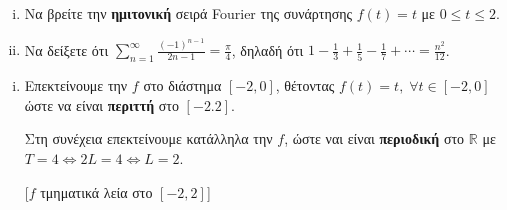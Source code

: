 \begin{mybox3}
  \begin{example}
  \item{}
  \item{}
    \begin{enumerate}[i)]
      \item Να βρείτε την \textbf{ημιτονική} σειρά Fourier της συνάρτησης 
        $ f(t)=t $ με $ 0 \leq t \leq 2 $.
      \item Να δείξετε ότι $ \sum_{n=1}^{\infty} \frac{(-1)^{n-1}}{2n-1} = 
        \frac{\pi}{4} $, δηλαδή ότι $ 1 - \frac{1}{3} + \frac{1}{5} - \frac{1}{7}
        + \cdots = \frac{n^{2}}{12} $.
    \end{enumerate}
  \end{example}
\end{mybox3}
\begin{solution}
\item {}
  \begin{enumerate}[i)]
    \item 
      Επεκτείνουμε την $f$ στο διάστημα $ [-2,0] $, θέτοντας $ f(t)=t, \; 
      \forall t \in [-2,0] $ ώστε να είναι \textbf{περιττή} στο $ [-2.2] $.

      Στη συνέχεια επεκτείνουμε κατάλληλα την $f$, ώστε ναι είναι 
      \textbf{περιοδική} στο 
      $ \mathbb{R} $ με $ T=4 \Leftrightarrow 2L=4 \Leftrightarrow \boxed{L=2} $.

      \vspace{\baselineskip}
      \begin{minipage}[t]{0.65\textwidth}
        [$f$ τμηματικά λεία στο $[-2,2]$]
      \end{minipage}


\end{enumerate}
\end{solution}
